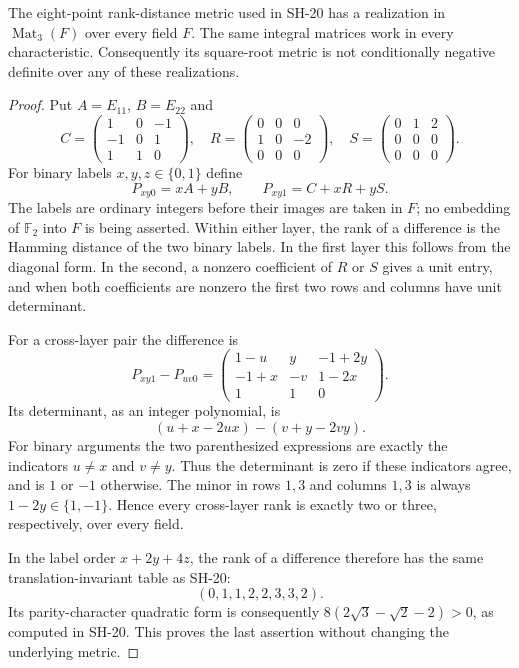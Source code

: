 \begin{proposition}
\label{rt:universal-rank-witness}
The eight-point rank-distance metric used in SH-20 has a
realization in $\operatorname{Mat}_3(F)$ over every field $F$.
The same integral matrices work in every characteristic.
Consequently its square-root metric is not conditionally
negative definite over any of these realizations.
\end{proposition}
\begin{proof}
Put $A=E_{11}$, $B=E_{22}$ and
\[
 C=\begin{pmatrix}1&0&-1\\-1&0&1\\1&1&0\end{pmatrix},
 \quad R=\begin{pmatrix}0&0&0\\1&0&-2\\0&0&0\end{pmatrix},
 \quad S=\begin{pmatrix}0&1&2\\0&0&0\\0&0&0\end{pmatrix}.
\]
For binary labels $x,y,z\in\{0,1\}$ define
\[
 P_{xy0}=xA+yB,\qquad P_{xy1}=C+xR+yS.
\]
The labels are ordinary integers before their images are taken
in $F$; no embedding of $\mathbb F_2$ into $F$ is being asserted.
Within either layer, the rank of a difference is the Hamming
distance of the two binary labels. In the first layer this
follows from the diagonal form. In the second, a nonzero
coefficient of $R$ or $S$ gives a unit entry, and when both
coefficients are nonzero the first two rows and columns have
unit determinant.

For a cross-layer pair the difference is
\[
 P_{xy1}-P_{uv0}=
 \begin{pmatrix}
 1-u&y&-1+2y\\
 -1+x&-v&1-2x\\
 1&1&0
 \end{pmatrix}.
\]
Its determinant, as an integer polynomial, is
\[
 (u+x-2ux)-(v+y-2vy).
\]
For binary arguments the two parenthesized expressions are
exactly the indicators $u\ne x$ and $v\ne y$. Thus the
determinant is zero if these indicators agree, and is $1$ or
$-1$ otherwise. The minor in rows $1,3$ and columns $1,3$ is
always $1-2y\in\{1,-1\}$. Hence every cross-layer rank is
exactly two or three, respectively, over every field.

In the label order $x+2y+4z$, the rank of a difference therefore
has the same translation-invariant table as SH-20:
\[
 (0,1,1,2,2,3,3,2).
\]
Its parity-character quadratic form is consequently
$8(2\sqrt3-\sqrt2-2)>0$, as computed in SH-20. This proves
the last assertion without changing the underlying metric.
\end{proof}

